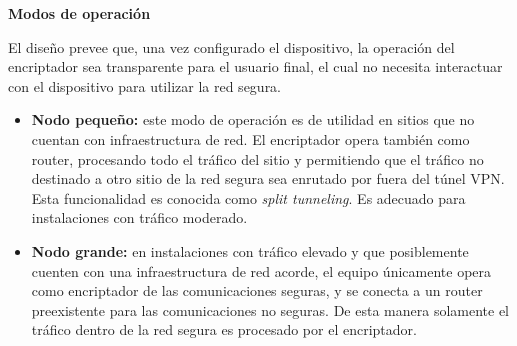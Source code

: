 \begin{center}
    \textbf{Modos de operación}
\end{center}

El diseño prevee que, una vez configurado el dispositivo, la operación del encriptador sea transparente para el usuario final, el cual no necesita interactuar con el dispositivo para utilizar la red segura.
\begin{itemize}
    \item \textbf{Nodo pequeño:} este modo de operación es de utilidad en sitios que no cuentan con infraestructura de red. El encriptador opera también como router, procesando todo el tráfico del sitio y permitiendo que el tráfico no destinado a otro sitio de la red segura sea enrutado por fuera del túnel VPN. Esta funcionalidad es conocida como \textit{split tunneling}. Es adecuado para instalaciones con tráfico moderado.
    \item \textbf{Nodo grande:} en instalaciones con tráfico elevado y que posiblemente cuenten con una infraestructura de red acorde, el equipo únicamente opera como encriptador de las comunicaciones seguras, y se conecta a un router preexistente para las comunicaciones no seguras. De esta manera solamente el tráfico dentro de la red segura es procesado por el encriptador.
\end{itemize}

